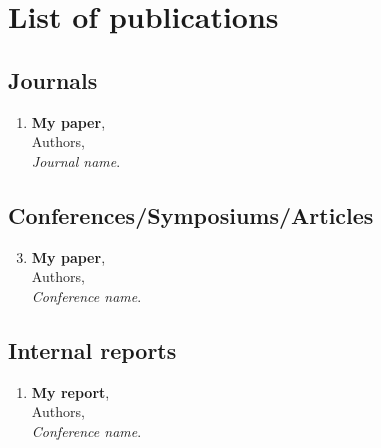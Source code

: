 
\chapter*{{List of publications}}
\section*{Journals}
\begin{enumerate}
\item {\bf My paper},\\Authors,\\\emph{Journal name}.
\end{enumerate}

\section*{Conferences/Symposiums/Articles}
\begin{enumerate}
\setcounter{enumi}{2}
\item {\bf My paper},\\Authors,\\\emph{Conference name}.
\end{enumerate}

\section*{Internal reports}
\begin{enumerate}
\item {\bf My report},\\Authors,\\\emph{Conference name}.
\end{enumerate}
